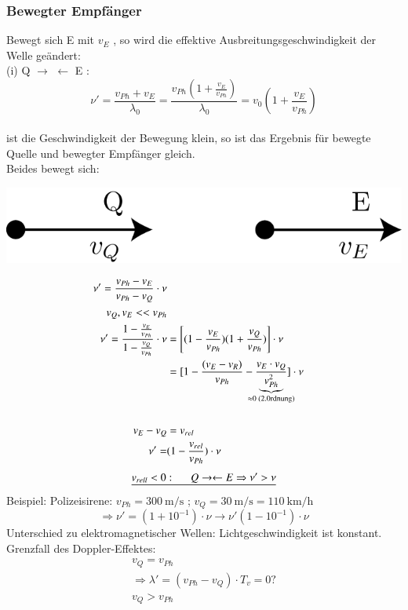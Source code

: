 \subsubsection{Bewegter Empfänger}
Bewegt sich E mit $ v_E $ , so wird die effektive Ausbreitungsgeschwindigkeit der Welle geändert:\\

(i) Q $ \rightarrow $ $ \leftarrow $ E :\\
$$ \nu'  = \frac{v_{Ph}+v_E}{\lambda_0} = \frac{v_{Ph}(1+\frac{v_E}{v_{Ph}})}{\lambda_0}=v_0(1+\frac{v_E}{v_{Ph}})$$\\
ist die Geschwindigkeit der Bewegung klein, so ist das Ergebnis für bewegte Quelle und bewegter Empfänger gleich.\\
Beides bewegt sich: 
\begin{center}
	\includegraphics[width=0.3\linewidth]{skizzen/19/19B30}
\end{center}
\begin{align*}
\nu'=\frac{v_{Ph}-v_E}{v_{Ph}-v_Q} \cdot \nu \\
v_Q,v_E << v_{Ph}\\
\nu'=\frac{1-\frac{v_E}{v_{Ph}}}{1-\frac{v_Q}{v_{Ph}}} \cdot \nu &= \left[ (1-\frac{v_E}{v_{Ph}}) (1+\frac{v_Q}{v_{Ph}})  \right] \cdot \nu \\
&= [ 1-\frac{(v_E-v_R)}{v_{Ph}} - \frac{v_E \cdot v_Q}{\underbrace{v^2_{Ph}}_{\mathclap{\approx 0 \text{ (2.0rdnung)}}}}  ] \cdot \nu\\
\enter
v_E-v_Q&=v_{rel}\\
\nu'=&(1-\frac{v_{rel}}{v_{Ph}}) \cdot \nu
\end{align*}
$$ \underline{v_{rell} < 0: \hspace{5mm} Q\rightarrow\leftarrow E \Rightarrow \nu' > \nu} $$
Beispiel: Polizeisirene: $ v_{Ph} = \SI{300}{\meter\per\second} $ ; $ v_Q=\SI{30}{\meter\per\second} = \SI{110}{\kilo\meter\per\hour}$
$$ \Rightarrow \nu'=(1+10^{-1}) \cdot \nu \longrightarrow \nu' (1-10^{-1}) \cdot \nu $$
\HL
Unterschied zu elektromagnetischer Wellen: Lichtgeschwindigkeit ist konstant.\\
Grenzfall des Doppler-Effektes:
\begin{align*}
v_Q=v_{Ph}\\
\Rightarrow \lambda'=(v_{Ph} - v_Q) \cdot T_v = 0?\\
v_Q > v_{Ph}
\end{align*}
